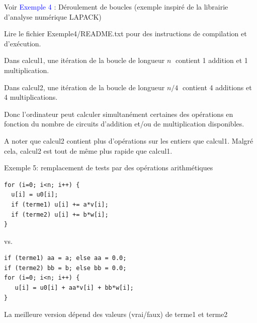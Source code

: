 \documentclass{beamer}
\begin{document}
\begin{frame}

Voir \textcolor{blue}{Exemple 4} : Déroulement de boucles
(exemple inspiré de la librairie d'analyse numérique LAPACK)

\vfill 

Lire le fichier Exemple4/README.txt pour des instructions de compilation et d'exécution.

\vfill 
	
	Dans calcul1, une itération de la boucle de longueur $n$ \newline \textcolor{white}{.}\hfill contient 1 addition et 1 multiplication.
	
	Dans calcul2, une itération de la boucle de longueur $n/4$ \newline \textcolor{white}{.}\hfill contient 4 additions et 4 multiplications.
	
	\vfill
	Donc l'ordinateur peut calculer simultanément certaines des opérations en fonction du nombre de circuits d'addition et/ou de multiplication disponibles.
	
	\vfill
	A noter que calcul2 contient plus d'opérations sur les entiers que calcul1.
	Malgré cela, calcul2 est tout de même plus rapide que calcul1.
		
\end{frame}

\begin{frame}[fragile]
Exemple 5: remplacement de tests par des opérations arithmétiques

\begin{lstlisting}
for (i=0; i<n; i++) {
  u[i] = u0[i];
  if (terme1) u[i] += a*v[i];
  if (terme2) u[i] += b*w[i];
}
\end{lstlisting}

vs.
\begin{lstlisting}
if (terme1) aa = a; else aa = 0.0;
if (terme2) bb = b; else bb = 0.0;
for (i=0; i<n; i++) {
   u[i] = u0[i] + aa*v[i] + bb*w[i];
}
\end{lstlisting}

La meilleure version dépend des valeurs (vrai/faux) de terme1 et terme2
\end{frame}
\end{document}
